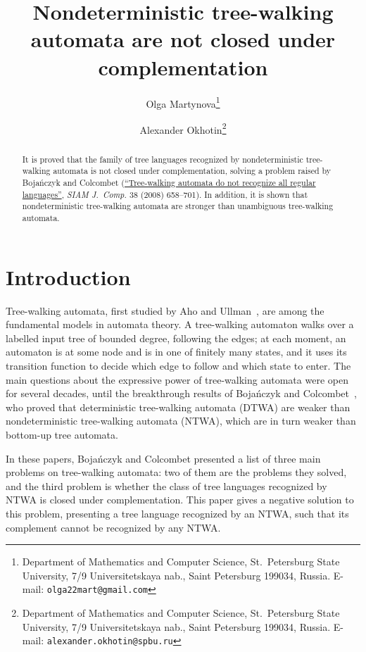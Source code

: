 \documentclass[12pt,a4paper]{article}
\theoremstyle{definition}
\begin{document}
\sloppy

\title{Nondeterministic tree-walking automata are not closed under complementation}
\author{Olga Martynova\thanks{Department of Mathematics and Computer Science,
	St.~Petersburg State University, 7/9 Universitetskaya nab., Saint Petersburg 199034, Russia.
	E-mail: \texttt{olga22mart@gmail.com}
} \and Alexander Okhotin\thanks{Department of Mathematics and Computer Science,
	St.~Petersburg State University, 7/9 Universitetskaya nab., Saint Petersburg 199034, Russia.
	E-mail: \texttt{alexander.okhotin@spbu.ru}
}}

\maketitle

\begin{abstract}
It is proved that the family of tree languages
recognized by nondeterministic tree-walking automata
is not closed under complementation,
solving a problem raised by Boja\'nczyk and Colcombet
(\href{https://doi.org/10.1137/050645427}{``Tree-walking automata do not recognize all regular languages''},
\emph{SIAM J.\ Comp.} 38 (2008) 658--701).
In addition, it is shown that nondeterministic tree-walking automata
are stronger than unambiguous tree-walking automata.
\end{abstract}




\section{Introduction}

Tree-walking automata, first studied by Aho and Ullman~\cite{AhoUllman},
are among the fundamental models in automata theory.
A tree-walking automaton walks over a labelled input tree of bounded degree, following the edges;
at each moment, an automaton is at some node and is in one of finitely many states,
and it uses its transition function to decide which edge to follow and which state to enter.
The main questions about the expressive power of tree-walking automata
were open for several decades,
until the breakthrough results of Boja\'nczyk and Colcombet~\cite{BojanczykColcombet_det,BojanczykColcombet_reg},
who proved that deterministic tree-walking automata (DTWA) are
weaker than nondeterministic tree-walking automata (NTWA),
which are in turn weaker than bottom-up tree automata.

In these papers, Boja\'nczyk and Colcombet
presented a list of three main problems on tree-walking automata:
two of them are the problems they solved,
and the third problem is whether the class of tree languages recognized by NTWA
is closed under complementation.
This paper gives a negative solution to this problem,
presenting a tree language recognized by an NTWA,
such that its complement cannot be recognized by any NTWA.
\end{document}
